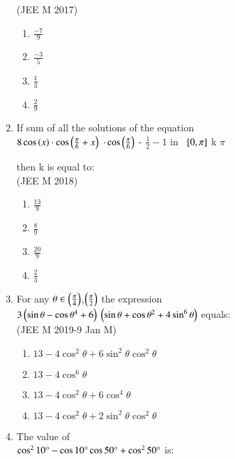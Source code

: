\documentclass[journal,10pt,twocolumn]{IEEEtran}
\theoremstyle{remark}
\begin{document}
\begin{enumerate}[start=14]
\hfill{(JEE M 2017)}\\
    \begin{enumerate}
    \item $\frac{-7}{9}$ 
    \item $\frac{-3}{5}$
    \item $\frac{1}{3}$
    \item $\frac{2}{9}$\\
    \end{enumerate}
 \item If sum of all the solutions of the equation\\
  $8 \cos\left(x\right) \cdot \cos\left(\frac{\pi}{6} + x \right)$ $\cdot \cos \left(\frac{\pi}{6}\right)$ - $\frac{1}{2} - 1 \text{ in }$ ${}\left[0, \pi\right]$ k $\pi$

 then k is equal to:\\
 
\hfill{(JEE M 2018)}\\
\begin{enumerate}
\item $\frac{13}{9}$
\item $\frac{8}{9}$\\
\item  $\frac{20}{9}$
\item  $\frac{2}{3}$\\
\end{enumerate}
  \item For any $\theta \in \left(\frac{\pi}{4}\right)$,$\left(\frac{\pi}{2}\right)$ the expression\\
 $3\left(\sin\theta-\cos\theta^4 +6\right)$ $\left(\sin\theta+\cos\theta^2 +4\sin^{6}\theta\right)$ equals:\\
 
\hfill {(JEE M 2019-9 Jan  M)}\\
 \begin{enumerate}
 \item $13-4\cos^2\theta +6\sin^2\theta \cos^2\theta $\\
 \item  $13-4\cos^6\theta$\\
\item  $13-4\cos^2\theta +6\cos^4\theta$\\
 \item $13-4\cos^2\theta +2\sin^2\theta \cos^2\theta$\\
 \end{enumerate}
\item The value of\\ $\cos^210\degree-\cos10\degree\cos50\degree+\cos^250\degree$ is:\\


\end{enumerate}
\end{document}
